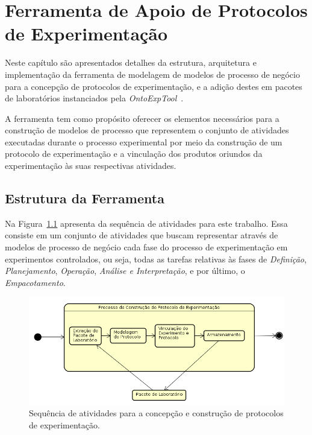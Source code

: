 \chapter{Ferramenta de Apoio de Protocolos de Experimentação}
\label{cp:prototipo}

Neste capítulo são apresentados detalhes da estrutura, arquitetura e implementação da ferramenta de modelagem de modelos de processo de negócio para a concepção de protocolos de experimentação, e a adição destes em pacotes de laboratórios instanciados pela \textit{OntoExpTool}~\cite{Pucci2014}.

A ferramenta tem como propósito oferecer os elementos necessários para a construção de modelos de processo que representem o conjunto de atividades executadas durante o processo experimental por meio da construção de um protocolo de experimentação e a vinculação dos produtos oriundos da experimentação às suas respectivas atividades.

\section{Estrutura da Ferramenta}

Na Figura~\ref{img:workflow} apresenta da sequência de atividades para este trabalho. Essa consiste em um conjunto de atividades que buscam representar através de modelos de processo de negócio cada fase do processo de experimentação em experimentos controlados, ou seja, todas as tarefas relativas às fases de \textit{Definição}, \textit{Planejamento}, \textit{Operação}, \textit{Análise e Interpretação}, e por último, o \textit{Empacotamento}.

\begin{figure}[!htb]
\centering
\includegraphics[width=\textwidth]{images/workflow.png}
\caption{Sequência de atividades para a concepção e construção de protocolos de experimentação.}
\label{img:workflow}
\end{figure}


